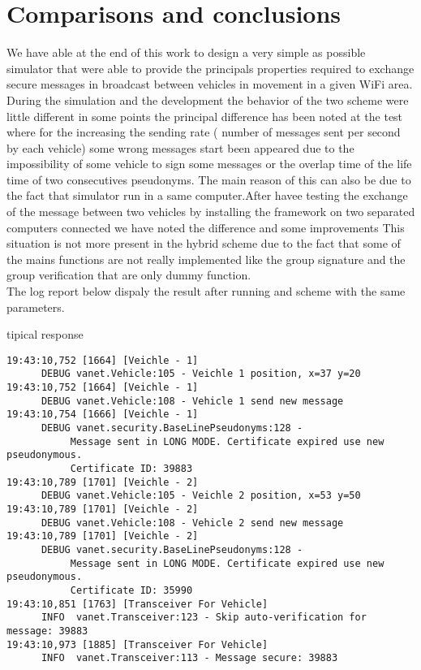 \section{Comparisons and conclusions}
We have able at the end of this work to design a very simple as possible simulator that were able to provide the principals properties required to exchange secure messages in broadcast between vehicles in movement in a given WiFi area.    
During the simulation and the development the behavior of the two scheme were little different in some points the principal difference has been noted at the test where for the \baseline increasing the sending rate ( number of messages sent per  second by each vehicle) some wrong messages start been appeared due to the impossibility of some vehicle to sign some messages or the overlap time of the life time of two consecutives pseudonyms. The main reason of this can also be due to the fact that simulator run in a same computer.After havee testing the exchange of the message between two vehicles by installing the framework on two separated computers connected we have noted the difference and some improvements
This situation is not more present in the hybrid scheme due to the fact that some of the mains functions are not really implemented like the group signature and the group verification that are only dummy function.\\

The log report below dispaly the result after running \baseline and \hybrid scheme with the same parameters.

\baseline tipical response
\begin{verbatim}
19:43:10,752 [1664] [Veichle - 1] 
      DEBUG vanet.Vehicle:105 - Veichle 1 position, x=37 y=20
19:43:10,752 [1664] [Veichle - 1] 
      DEBUG vanet.Vehicle:108 - Vehicle 1 send new message
19:43:10,754 [1666] [Veichle - 1] 
      DEBUG vanet.security.BaseLinePseudonyms:128 - 
           Message sent in LONG MODE. Certificate expired use new pseudonymous. 
           Certificate ID: 39883
19:43:10,789 [1701] [Veichle - 2] 
      DEBUG vanet.Vehicle:105 - Veichle 2 position, x=53 y=50
19:43:10,789 [1701] [Veichle - 2] 
      DEBUG vanet.Vehicle:108 - Vehicle 2 send new message
19:43:10,789 [1701] [Veichle - 2] 
      DEBUG vanet.security.BaseLinePseudonyms:128 - 
           Message sent in LONG MODE. Certificate expired use new pseudonymous. 
           Certificate ID: 35990
19:43:10,851 [1763] [Transceiver For Vehicle] 
      INFO  vanet.Transceiver:123 - Skip auto-verification for message: 39883
19:43:10,973 [1885] [Transceiver For Vehicle] 
      INFO  vanet.Transceiver:113 - Message secure: 39883
\end{verbatim}

